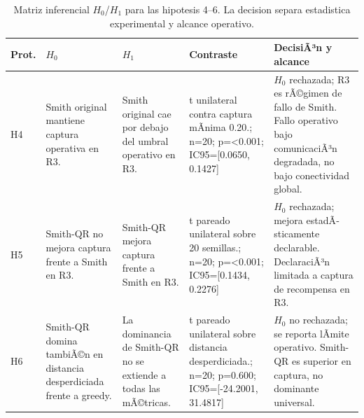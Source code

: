 \begin{table}[H]
\centering
\caption{Matriz inferencial $H_0$/$H_1$ para las hipotesis 4--6. La decision separa estadistica experimental y alcance operativo.}
\label{tab:hypothesis-decision-base-b}
\scriptsize
\begin{tabularx}{\textwidth}{@{}>{\raggedright\arraybackslash}p{}>{\raggedright\arraybackslash}p{}>{\raggedright\arraybackslash}p{}>{\raggedright\arraybackslash}p{}>{\raggedright\arraybackslash}X@{}}
\toprule
Prot. & $H_0$ & $H_1$ & Contraste & DecisiÃ³n y alcance \\
\midrule
H4 & Smith original mantiene captura operativa en R3. & Smith original cae por debajo del umbral operativo en R3. & t unilateral contra captura mÃ­nima 0.20.; n=20; p=\textless{}0.001; IC95=[0.0650, 0.1427] & $H_0$ rechazada; R3 es rÃ©gimen de fallo de Smith. Fallo operativo bajo comunicaciÃ³n degradada, no bajo conectividad global. \\
H5 & Smith-QR no mejora captura frente a Smith en R3. & Smith-QR mejora captura frente a Smith en R3. & t pareado unilateral sobre 20 semillas.; n=20; p=\textless{}0.001; IC95=[0.1434, 0.2276] & $H_0$ rechazada; mejora estadÃ­sticamente declarable. DeclaraciÃ³n limitada a captura de recompensa en R3. \\
H6 & Smith-QR domina tambiÃ©n en distancia desperdiciada frente a greedy. & La dominancia de Smith-QR no se extiende a todas las mÃ©tricas. & t pareado unilateral sobre distancia desperdiciada.; n=20; p=0.600; IC95=[-24.2001, 31.4817] & $H_0$ no rechazada; se reporta lÃ­mite operativo. Smith-QR es superior en captura, no dominante universal. \\
\bottomrule
\end{tabularx}
\end{table}

